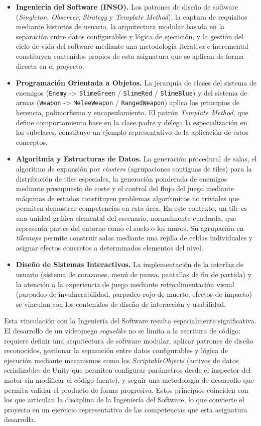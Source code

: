 \begin{itemize}
\item \textbf{Ingeniería del Software (INSO).} Los patrones de diseño de software (\textit{Singleton}, \textit{Observer}, \textit{Strategy} y \textit{Template Method}), la captura de requisitos mediante historias de usuario, la arquitectura modular basada en la separación entre datos configurables y lógica de ejecución, y la gestión del ciclo de vida del software mediante una metodología iterativa e incremental constituyen contenidos propios de esta asignatura que se aplican de forma directa en el proyecto.
\item \textbf{Programación Orientada a Objetos.} La jerarquía de clases del sistema de enemigos (\texttt{Enemy} -> \texttt{SlimeGreen} / \texttt{SlimeRed} / \texttt{SlimeBlue}) y del sistema de armas (\texttt{Weapon} -> \texttt{MeleeWeapon} / \texttt{RangedWeapon}) aplica los principios de herencia, polimorfismo y encapsulamiento. El patrón \textit{Template Method}, que define comportamiento base en la clase padre y delega la especialización en las subclases, constituye un ejemplo representativo de la aplicación de estos conceptos.
\item \textbf{Algoritmia y Estructuras de Datos.} La generación procedural de salas, el algoritmo de expansión por \textit{clusters} (agrupaciones contiguas de tiles) para la distribución de tiles especiales, la generación ponderada de enemigos mediante presupuesto de coste y el control del flujo del juego mediante máquinas de estados constituyen problemas algorítmicos no triviales que permiten demostrar competencias en esta área. En este contexto, un tile es una unidad gráfica elemental del escenario, normalmente cuadrada, que representa partes del entorno como el suelo o los muros. Su agrupación en \textit{tilemaps} permite construir salas mediante una rejilla de celdas individuales y asignar efectos concretos a determinados elementos del nivel.
\item \textbf{Diseño de Sistemas Interactivos.} La implementación de la interfaz de usuario (sistema de corazones, menú de pausa, pantallas de fin de partida) y la atención a la experiencia de juego mediante retroalimentación visual (parpadeo de invulnerabilidad, parpadeo rojo de muerte, efectos de impacto) se vinculan con los contenidos de diseño de interacción y usabilidad.
\end{itemize}

Esta vinculación con la Ingeniería del Software resulta especialmente significativa. El desarrollo de un videojuego \textit{roguelike} no se limita a la escritura de código: requiere definir una arquitectura de software modular, aplicar patrones de diseño reconocidos, gestionar la separación entre datos configurables y lógica de ejecución mediante mecanismos como los \textit{ScriptableObjects} (activos de datos serializables de Unity que permiten configurar parámetros desde el inspector del motor sin modificar el código fuente), y seguir una metodología de desarrollo que permita validar el producto de forma progresiva. Estos principios coinciden con los que articulan la disciplina de la Ingeniería del Software, lo que convierte el proyecto en un ejercicio representativo de las competencias que esta asignatura desarrolla.

